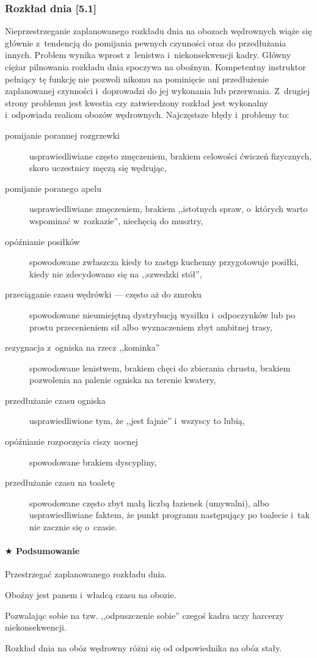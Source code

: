 \documentclass[a5paper,10pt,titlepage,twoside]{article}
\newcommand*{\thecheckbox}{\hss$\Box$} %
\newenvironment*{checklist}
{\list{}{%
\renewcommand*{\makelabel}[1]{\thecheckbox}}}
{\endlist}
\begin{document}
\subsubsection{Rozkład dnia [5.1]}
Nieprzestrzeganie zaplanowanego rozkładu dnia na obozach wędrownych wiąże się głównie z~tendencją do pomijania pewnych czynności oraz do przedłużania innych. Problem wynika wprost z~lenistwa i~niekonsekwencji kadry. Główny ciężar pilnowania rozkładu dnia spoczywa na oboźnym. Kompetentny instruktor pełniący tę funkcję nie pozwoli nikomu na pominięcie ani przedłużenie zaplanowanej czynności i~doprowadzi do jej wykonania lub przerwania. Z~drugiej strony problemu jest kwestia czy zatwierdzony rozkład jest wykonalny i~odpowiada realiom obozów wędrownych. Najczęstsze błędy i~problemy to:
\begin{description}
\item[pomijanie porannej rozgrzewki] usprawiedliwiane często zmęczeniem, brakiem celowości ćwiczeń fizycznych, skoro uczestnicy męczą się wędrując,
\item[pomijanie poranego apelu] usprawiedliwiane zmęczeniem, brakiem ,,istotnych spraw, o~których warto wspominać w~rozkazie'', niechęcią do musztry,
\item[opóźnianie posiłków] spowodowane zwłaszcza kiedy to zastęp kuchenny przygotowuje posiłki, kiedy nie zdecydowano się na ,,szwedzki stół'',
\item[przeciąganie czasu wędrówki --- często aż do zmroku] spowodowane nieumiejętną dystrybucją wysiłku i~odpoczynków lub po prostu przecenieniem sił albo wyznaczeniem zbyt ambitnej trasy,
\item[rezygnacja z~ogniska na rzecz ,,kominka''] spowodowane lenistwem, brakiem chęci do zbierania chrustu, brakiem pozwolenia na palenie ogniska na terenie kwatery,
\item[przedłużanie czasu ogniska] usprawiedliwione tym, że ,,jest fajnie'' i~wszyscy to lubią,
\item[opóźnianie rozpoczęcia ciszy nocnej] spowodowane brakiem dyscypliny,
\item[przedłużanie czasu na toaletę] spowodowane często zbyt małą liczbą łazienek (umywalni), albo usprawiedliwiane faktem, że punkt programu następujący po toalecie i~tak nie zacznie się o~czasie.
\end{description}
\paragraph{$\bigstar$ Podsumowanie}
\begin{checklist}
\item Przestrzegać zaplanowanego rozkładu dnia.
\item Oboźny jest panem i~władcą czasu na obozie.
\item Pozwalając sobie na tzw. ,,odpuszczenie sobie'' czegoś kadra uczy harcerzy niekonsekwencji.
\item Rozkład dnia na obóz wędrowny różni się od odpowiednika na obóz stały.
\end{checklist}
\end{document}
